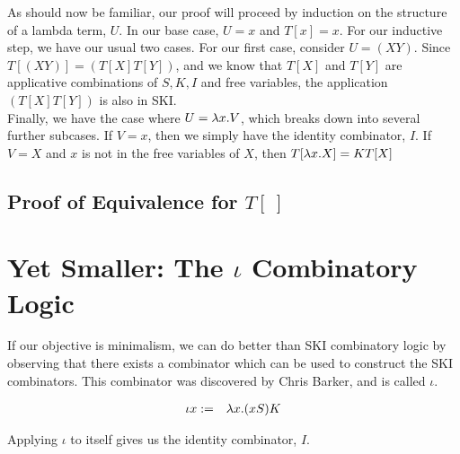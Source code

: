 As should now be familiar, our proof will proceed by induction on the structure of a lambda term, $U$. In our base case, $U = x$ and $T[x] = x$. For our inductive step, we have our usual two cases. For our first case, consider $U = (XY)$. Since $T[(XY)] = (T[X]T[Y])$, and we know that $T[X]$ and $T[Y]$ are applicative combinations of $S,K,I$ and free variables, the application $(T[X]T[Y])$ is also in SKI.\\

Finally, we have the case where $U = \lambda x.V$, which breaks down into several further subcases. If $V = x$, then we simply have the identity combinator, $I$. If $V = X$ and $x$ is not in the free variables of $X$, then $T[\lambda x.X] = KT[X]$


\subsection{Proof of Equivalence for $T[\ ]$}

\section{Yet Smaller: The $\iota$ Combinatory Logic}
If our objective is minimalism, we can do better than SKI combinatory logic by observing that there exists a combinator which can be used to construct the SKI combinators. This combinator was discovered by Chris Barker, and is called $\iota$.

\begin{eqnarray*}
  \iota x &:=& \lambda x.(xS)K\\
\end{eqnarray*}

Applying $\iota$ to itself gives us the identity combinator, $I$.\\


